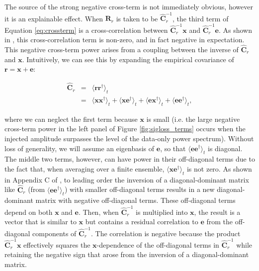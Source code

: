 \documentclass[preprint2,numberedappendix,tighten]{aastex6}  %
\begin{document}
The source of the strong negative cross-term is not immediately obvious, however it is an explainable effect. 
When $\textbf{R}_{r}$
is taken to be $\widehat{\textbf{C}}_{r}^{-1}$, the third term of Equation \eqref{eq:crossterm} is a cross-correlation between $\widehat{\textbf{C}}_{r}^{-1}\textbf{x}$ and
$\widehat{\textbf{C}}_{r}^{-1}\textbf{e}$. As shown in \citet{switzer_et_al2015}, this cross-correlation term is non-zero, and in fact negative in expectation. 
This negative cross-term power arises from a coupling between the inverse of 
$\widehat{\textbf{C}}_{r}$ and $\mathbf{x}$. 
Intuitively, we can see this by expanding the empirical covariance of $\textbf{r}=\textbf{x}+\textbf{e}$:

\begin{eqnarray}
\widehat{\textbf{C}}_{r} &=& \langle \textbf{rr}^{\dagger} \rangle_{t} \nonumber \\ 
&=& \langle \textbf{xx}^{\dagger} \rangle_{t} + \langle \textbf{xe}^{\dagger} \rangle_{t} + \langle \textbf{ex}^{\dagger} \rangle_{t} + \langle 
\textbf{ee}^{\dagger} \rangle_{t},
\end{eqnarray}

\noindent where we can neglect the first term because $\textbf{x}$ is small (i.e. the large negative cross-term power in the left panel of Figure \ref{fig:sigloss_terms} occurs when the injected amplitude surpasses the level of the data-only power spectrum).  Without loss of generality, we will assume
an eigenbasis of $\textbf{e}$, so that $\langle 
\textbf{ee}^{\dagger} \rangle_{t}$ is diagonal. The middle 
two terms, however, can have power in their off-diagonal terms due to the fact that, when averaging over a finite
ensemble, $\langle\textbf{xe}^\dagger\rangle_t$ is not zero.  As shown in Appendix C of \citet{parsons_et_al2014}%
, to leading order the inversion of a diagonal-dominant matrix like $\widehat{\textbf{C}}_{r}$ (from $\langle 
\textbf{ee}^{\dagger} \rangle_{t}$) with smaller
off-diagonal terms results in a new diagonal-dominant matrix with negative off-diagonal terms. These off-diagonal
terms depend on both $\textbf{x}$ and $\textbf{e}$. Then, when $\widehat{\textbf{C}}^{-1}_{r}$ is multiplied into $\textbf{x}$,
the result is a vector that is similar to $\textbf{x}$ but
contains a residual correlation to $\textbf{e}$ from the off-diagonal components of $\widehat{\textbf{C}}^{-1}_{r}$. The
correlation is negative because the product $\widehat{\textbf{C}}_r^{-1}\textbf{x}$ effectively squares the $\textbf{x}$-dependence
of the off-diagonal terms in $\widehat{\textbf{C}}^{-1}_{r}$ while retaining the negative sign that arose from the inversion
of a diagonal-dominant matrix.
\end{document}
